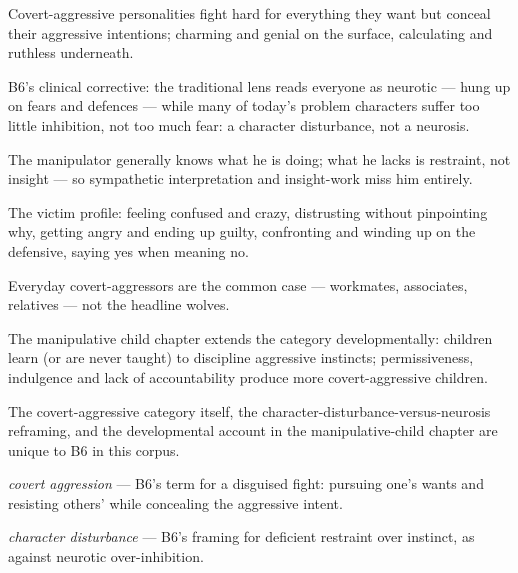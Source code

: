 

\begin{distilled}
  \item Covert-aggressive personalities fight hard for everything they want but conceal their aggressive intentions; charming and genial on the surface, calculating and ruthless underneath.
  \item B6's clinical corrective: the traditional lens reads everyone as neurotic --- hung up on fears and defences --- while many of today's problem characters suffer too little inhibition, not too much fear: a character disturbance, not a neurosis.
  \item The manipulator generally knows what he is doing; what he lacks is restraint, not insight --- so sympathetic interpretation and insight-work miss him entirely.
  \item The victim profile: feeling confused and crazy, distrusting without pinpointing why, getting angry and ending up guilty, confronting and winding up on the defensive, saying yes when meaning no.
  \item Everyday covert-aggressors are the common case --- workmates, associates, relatives --- not the headline wolves.
  \item The manipulative child chapter extends the category developmentally: children learn (or are never taught) to discipline aggressive instincts; permissiveness, indulgence and lack of accountability produce more covert-aggressive children.
\end{distilled}
\begin{unique}
  \item The covert-aggressive category itself, the character-disturbance-versus-neurosis reframing, and the developmental account in the manipulative-child chapter are unique to B6 in this corpus.
\end{unique}
\begin{terms}
  \item \emph{covert aggression} --- B6's term for a disguised fight: pursuing one's wants and resisting others' while concealing the aggressive intent.
  \item \emph{character disturbance} --- B6's framing for deficient restraint over instinct, as against neurotic over-inhibition.
\end{terms}
